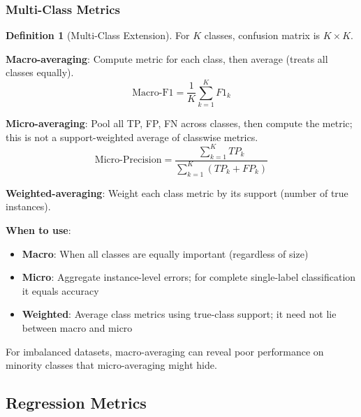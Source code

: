 \documentclass[11pt,twoside]{article}
\numberwithin{equation}{section}
\theoremstyle{plain}
\theoremstyle{definition}
\newtheorem{definition}[theorem]{Definition}
\theoremstyle{remark}
\newenvironment{keyidea}{
  \begin{tcolorbox}[colback=yellow!5!white,
                    colframe=yellow!50!black,
                    title=Key Idea,
                    breakable,
                    enhanced,
                    sharp corners,
                    boxrule=0.8pt,
                    left=6pt, right=6pt, top=6pt, bottom=6pt]
}{
  \end{tcolorbox}
}
\begin{document}
\subsubsection{Multi-Class Metrics}

\begin{definition}[Multi-Class Extension]
For $K$ classes, confusion matrix is $K \times K$.

\textbf{Macro-averaging}: Compute metric for each class, then average (treats all classes equally).
\[
\text{Macro-F1} = \frac{1}{K}\sum_{k=1}^K F1_k
\]

\textbf{Micro-averaging}: Pool all TP, FP, FN across classes, then compute the metric; this is not a support-weighted average of classwise metrics.
\[
\text{Micro-Precision} = \frac{\sum_{k=1}^K TP_k}{\sum_{k=1}^K (TP_k + FP_k)}
\]

\textbf{Weighted-averaging}: Weight each class metric by its support (number of true instances).
\end{definition}

\begin{keyidea}
\textbf{When to use}:
\begin{itemize}
\item \textbf{Macro}: When all classes are equally important (regardless of size)
\item \textbf{Micro}: Aggregate instance-level errors; for complete single-label classification it equals accuracy
\item \textbf{Weighted}: Average class metrics using true-class support; it need not lie between macro and micro
\end{itemize}

For imbalanced datasets, macro-averaging can reveal poor performance on minority classes that micro-averaging might hide.
\end{keyidea}

\subsection{Regression Metrics}
\end{document}
